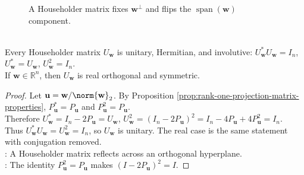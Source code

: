 \begin{figure}[H]
  \centering
  
  \caption{A Householder matrix fixes $\mathbf{w}^{\perp}$ and flips the $\operatorname{span}(\mathbf{w})$ component.}
  \label{fig:householder-reflection}
\end{figure}

\begin{theorem} \label{thm:householder-matrix-properties} \\
Every Householder matrix $U_{\mathbf{w}}$ is unitary, Hermitian, and involutive: $U_{\mathbf{w}}^*U_{\mathbf{w}}=I_n$, $U_{\mathbf{w}}^*=U_{\mathbf{w}}$, $U_{\mathbf{w}}^2=I_n$.\\
If $\mathbf{w}\in\mathbb{R}^n$, then $U_{\mathbf{w}}$ is real orthogonal and symmetric.
\begin{proof}
Let $\mathbf{u}=\mathbf{w}/\norm{\mathbf{w}}_2$. By Proposition \ref{prop:rank-one-projection-matrix-properties}, $P_{\mathbf{u}}^*=P_{\mathbf{u}}$ and $P_{\mathbf{u}}^2=P_{\mathbf{u}}$.\\
Therefore $U_{\mathbf{w}}^*=I_n-2P_{\mathbf{u}}=U_{\mathbf{w}}$, $U_{\mathbf{w}}^2=(I_n-2P_{\mathbf{u}})^2=I_n-4P_{\mathbf{u}}+4P_{\mathbf{u}}^2=I_n$.\\
Thus $U_{\mathbf{w}}^*U_{\mathbf{w}}=U_{\mathbf{w}}^2=I_n$, so $U_{\mathbf{w}}$ is unitary. The real case is the same statement with conjugation removed.\\
: A Householder matrix reflects across an orthogonal hyperplane.\\
: The identity $P_{\mathbf{u}}^2=P_{\mathbf{u}}$ makes $(I-2P_{\mathbf{u}})^2=I$.
\end{proof}
\end{theorem}

